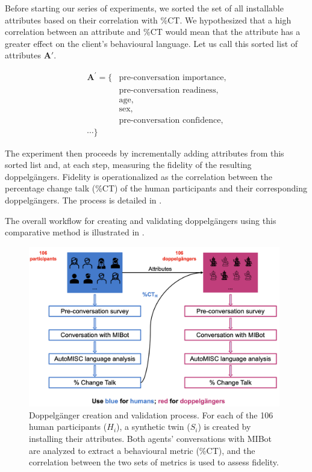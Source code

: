 Before starting our series of experiments, we sorted the set of all installable attributes based on their correlation with \%CT. We hypothesized that a high correlation between an attribute and \%CT would mean that the attribute has a greater effect on the client's behavioural language. Let us call this sorted list of attributes $\mathbf{A'}$.

$$
	\begin{aligned}
		{\textbf{A}}^{'} = \{ & \text{pre-conversation importance,} \\
		                      & \text{pre-conversation readiness,}  \\
		                      & \text{age,}                         \\
		                      & \text{sex,}                         \\
		                      & \text{pre-conversation confidence,} \\
		\cdots \}
	\end{aligned}
$$

The experiment then proceeds by incrementally adding attributes from this sorted list and, at each step, measuring the fidelity of the resulting doppelgängers. Fidelity is operationalized as the correlation between the percentage change talk (\%CT) of the human participants and their corresponding doppelgängers. The process is detailed in .


The overall workflow for creating and validating doppelgängers using this comparative method is illustrated in .

\begin{figure}[htpb]
	\centering
	\includegraphics[width=0.98\textwidth]{fig/doppelganger-study.png}
	\caption[Doppelgänger creation and validation process]{Doppelgänger creation and validation process. For each of the 106 human participants ($H_i$), a synthetic twin ($S_i$) is created by installing their attributes. Both agents' conversations with MIBot are analyzed to extract a behavioural metric (\%CT), and the correlation between the two sets of metrics is used to assess fidelity.}
	\label{fig:doppelgänger-study}
\end{figure}

